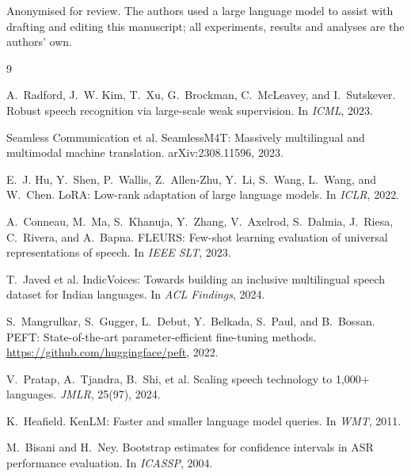 \documentclass[sigconf,anonymous,review]{acmart}
\begin{document}
\begin{acks}
Anonymised for review. The authors used a large language model to assist with
drafting and editing this manuscript; all experiments, results and analyses are
the authors' own.
\end{acks}


\begin{thebibliography}{9}

A.~Radford, J.~W. Kim, T.~Xu, G.~Brockman, C.~McLeavey, and I.~Sutskever.
\newblock Robust speech recognition via large-scale weak supervision.
\newblock In \emph{ICML}, 2023.

Seamless Communication et al.
\newblock SeamlessM4T: Massively multilingual and multimodal machine
translation.
\newblock arXiv:2308.11596, 2023.

E.~J. Hu, Y.~Shen, P.~Wallis, Z.~Allen-Zhu, Y.~Li, S.~Wang, L.~Wang, and
W.~Chen.
\newblock LoRA: Low-rank adaptation of large language models.
\newblock In \emph{ICLR}, 2022.

A.~Conneau, M.~Ma, S.~Khanuja, Y.~Zhang, V.~Axelrod, S.~Dalmia, J.~Riesa,
C.~Rivera, and A.~Bapna.
\newblock FLEURS: Few-shot learning evaluation of universal representations of
speech.
\newblock In \emph{IEEE SLT}, 2023.

T.~Javed et al.
\newblock IndicVoices: Towards building an inclusive multilingual speech dataset
for Indian languages.
\newblock In \emph{ACL Findings}, 2024.

S.~Mangrulkar, S.~Gugger, L.~Debut, Y.~Belkada, S.~Paul, and B.~Bossan.
\newblock PEFT: State-of-the-art parameter-efficient fine-tuning methods.
\newblock \url{https://github.com/huggingface/peft}, 2022.

V.~Pratap, A.~Tjandra, B.~Shi, et al.
\newblock Scaling speech technology to 1,000+ languages.
\newblock \emph{JMLR}, 25(97), 2024.

K.~Heafield.
\newblock KenLM: Faster and smaller language model queries.
\newblock In \emph{WMT}, 2011.

M.~Bisani and H.~Ney.
\newblock Bootstrap estimates for confidence intervals in ASR performance
evaluation.
\newblock In \emph{ICASSP}, 2004.

\end{thebibliography}
\end{document}
